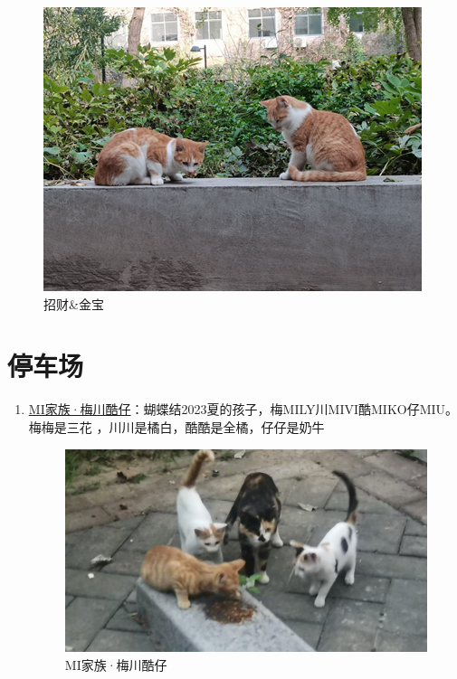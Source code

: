 \documentclass[zihao=-4,fontset=none]{Beautybook-CN}
\begin{document}
\begin{enumerate}
\begin{figure}[htbp]
        \qquad
            \includegraphics[width=0.4\linewidth]{media/cimage46.png}
            \caption{招财\&金宝}
            \label{img4546}
    \end{figure}
    \end{enumerate}
\section{停车场}
\begin{enumerate}
    \item \hyperref[img47]{MI家族·梅川酷仔}：蝴蝶结2023夏的孩子，梅MILY川MIVI酷MIKO仔MIU。梅梅是三花 ，川川是橘白，酷酷是全橘，仔仔是奶牛
    \begin{figure}[htbp]
            \centering
            \includegraphics[width=0.4\linewidth]{media/cimage47.png}
            \caption{MI家族·梅川酷仔}
            \label{img47}
    \end{figure}
    \end{enumerate}
\end{document}
